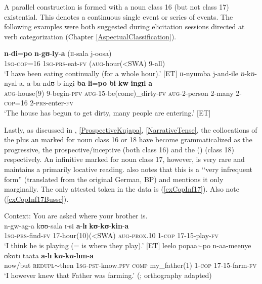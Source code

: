 A parallel construction is formed with a noun class 16 (but not class 17) existential. This denotes a continuous single event or series of events. The following examples were both suggested during elicitation sessions directed at verb categorization (Chapter \ref{AspectualClassification}).

\begin{exe}
\ex\gll \textbf{n}-\textbf{di}=\textbf{po} \textbf{n}-\textbf{gʊ}-\textbf{ly}-\textbf{a} (ɪɪ-sala j-oosa)\\
\textsc{1sg}-\textsc{cop}=16 \textsc{1sg}-\textsc{prs}-eat-\textsc{fv} (\textsc{aug}-hour(<SWA) 9-all)\\
\glt \lq I have been eating continually (for a whole hour).' [ET]
\ex \gll ɪɪ-nyumba j-and-ile ʊ-kʊ-nyal-a, a-ba-ndʊ b-ingi \textbf{ba}-\textbf{li}=\textbf{po} \textbf{bi}-\textbf{kw}-\textbf{ingɪl}-\textbf{a}\\
\textsc{aug}-house(9) 9-begin-\textsc{pfv} \textsc{aug}-15-be(come)\_dirty-\textsc{fv} \textsc{aug}-2-person 2-many 2-\textsc{cop}=16 2-\textsc{prs}-enter-\textsc{fv}\\
\glt \lq The house has begun to get dirty, many people are entering.' [ET]
\end{exe}

Lastly, as discussed in , \ref{ProspectiveKujapa}, \ref{NarrativeTense}, the collocations of the  plus an  marked for  noun class 16 or 18 have become grammaticalized as the progressive, the prospective/inceptive (both class 16) and the  () (class 18) respectively. An infinitive marked for  noun class 17, however, is very rare and maintains a primarily locative reading. \citet[23]{SchumannK1899} also notes that this is a \lq\lq very infrequent form'' (translated from the original German, BP) and \citet{EndemannC1914} mentions it only marginally. The only attested token in the data is (\ref{exCopInf17}). Also note (\ref{exCopInf17Busse}).

\begin{exe}
\ex \label{exCopInf17}Context: You are asked where your brother is.\\
\gll n-gw-ag-a kʊʊ-sala ɪ-si \textbf{a}-\textbf{lɪ} \textbf{kʊ}-\textbf{kʊ}-\textbf{kin}-\textbf{a}\\
\textsc{1sg}-\textsc{prs}-find-\textsc{fv} 17-hour(10)(<SWA) \textsc{aug}-\textsc{prox.10} 1-\textsc{cop} 17-15-play-\textsc{fv}\\
\glt \lq I think he is playing (= is where they play).' [ET]
\ex \label{exCopInf17Busse}
\gll leelo popaa$\sim$po n-aa-meenye ʊkʊtɪ taata \textbf{a}-\textbf{lɪ} \textbf{kʊ}-\textbf{kʊ}-\textbf{lɪm}-\textbf{a}\\
now/but \textsc{redupl}$\sim$then \textsc{1sg}-\textsc{pst}-know.\textsc{pfv} \textsc{comp} my\_father(1) 1-\textsc{cop} 17-15-farm-\textsc{fv}\\ \largerpage
\glt \lq I however knew that Father was farming.' (\citealt[204]{BusseJ1949}; orthography adapted)
\end{exe}

